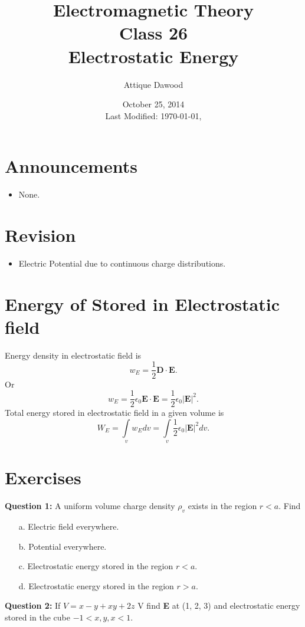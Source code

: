 \documentclass[12pt,a4paper]{article}
\title{Electromagnetic Theory\\Class 26\\Electrostatic Energy}
\author{Attique Dawood}
\date{October 25, 2014\\[0.2cm] Last Modified: \today, \currenttime}
\begin{document}
\maketitle
\section{Announcements}
\begin{itemize}
\item None.
\end{itemize}
\section{Revision}
\begin{itemize}
\item Electric Potential due to continuous charge distributions.
\end{itemize}
\section{Energy of Stored in Electrostatic field}
Energy density in electrostatic field is
\begin{equation}
w_E=\dfrac{1}{2}\mathrm{\textbf{D}}\cdot\mathrm{\textbf{E}}.
\end{equation}
Or
\begin{equation}
w_E=\dfrac{1}{2}\epsilon_0\mathrm{\textbf{E}}\cdot\mathrm{\textbf{E}}=\dfrac{1}{2}\epsilon_0|\mathrm{\textbf{E}}|^2.
\end{equation}
Total energy stored in electrostatic field in a given volume is
\begin{equation}
W_E=\int\limits_vw_Edv=\int\limits_v\dfrac{1}{2}\epsilon_0|\mathrm{\textbf{E}}|^2dv.
\end{equation}
\section{Exercises}
\noindent\textbf{Question 1:} A uniform volume charge density $\rho_v$ exists in the region $r<a$. Find
\begin{itemize}
\item[a.] Electric field everywhere.
\item[b.] Potential everywhere.
\item[c.] Electrostatic energy stored in the region $r<a$.
\item[d.] Electrostatic energy stored in the region $r>a$.
\end{itemize}
\noindent\textbf{Question 2:} If $V=x-y+xy+2z$ V find \textbf{E} at (1, 2, 3) and  electrostatic energy stored in the cube $-1<x,y,x<1$.
%
%
\end{document}
